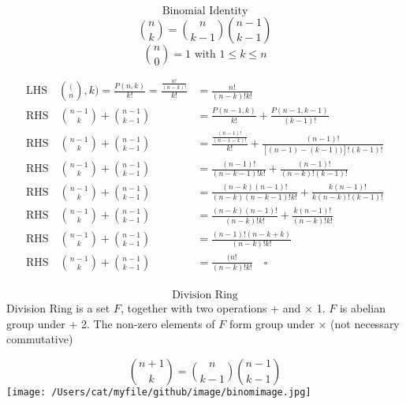 \documentclass[10pt]{article}
\begin{document}
\noindent
\[ \text{Binomial Identity} \] 
\[  \binom{n}{k} = \binom{n}{k-1} \binom{n-1}{k-1} \] 
\[ \binom{n}{0} = 1 \text{ with } 1 \leq k \leq n\] 


\begin{equation}
\begin{aligned}
\text{LHS} \quad \binom(n, k) = \frac{P(n, k)}{k!} = \frac{\frac{n!}{(n-k)!}}{k!} &= \frac{n!}{(n-k)! k!}\\
    \text{RHS} \quad \binom{n-1}{k} + \binom{n-1}{k-1} &= \frac{P(n-1, k)}{k!} + \frac{P(n-1, k-1)}{(k-1)!}  \\  
    \text{RHS} \quad \binom{n-1}{k} + \binom{n-1}{k-1} &= \frac{\frac{(n-1)!}{(n-1-k)!}}{k!} + \frac{(n-1)!}{[(n-1)-(k-1))]!(k-1)!}\\    
    \text{RHS} \quad \binom{n-1}{k} + \binom{n-1}{k-1} &= \frac{(n-1)!}{(n-k-1)!k!} + \frac{(n-1)!}{(n-k)!(k-1)!}\\    
    \text{RHS} \quad \binom{n-1}{k} + \binom{n-1}{k-1} &= \frac{(n-k)(n-1)!}{(n-k)(n-k-1)!k!} + \frac{k(n-1)!}{k(n-k)!(k-1)!}\\    
    \text{RHS} \quad \binom{n-1}{k} + \binom{n-1}{k-1} &= \frac{(n-k)(n-1)!}{(n-k)!k!} + \frac{k(n-1)!}{(n-k)!k!}\\    
    \text{RHS} \quad \binom{n-1}{k} + \binom{n-1}{k-1} &= \frac{(n-1)!(n-k+k)}{(n-k)!k!}\\    
    \text{RHS} \quad \binom{n-1}{k} + \binom{n-1}{k-1} &= \frac{(n!}{(n-k)!k!} \nonumber \quad \square\\    
\end{aligned}
\end{equation}

\[ \text{Division Ring} \] 
Division Ring is a set $F$, together with two operations + and $\times$ 
1. $F$ is abelian group under +
2. The non-zero elements of $F$ form group under $\times$ (not necessary commutative)


\newpage
\[  \binom{n+1}{k} = \binom{n}{k-1} \binom{n-1}{k-1} \] 
\texttt{[image: /Users/cat/myfile/github/image/binomimage.jpg]}\\
\end{document}
